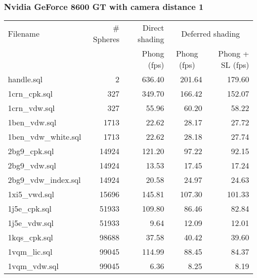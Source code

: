 \subsubsection*{Nvidia GeForce 8600 GT with camera distance 1}
\begin{tabular}{|l|r|r|r|r|}
\hline
Filename & \# Spheres & Direct shading & \multicolumn{2}{|c|}{Deferred shading} \\
         &            & Phong (fps)    & \multicolumn{1}{|c}{Phong (fps)} & Phong + SL (fps) \\  
\hline
\hline
handle.sql & 2 & 636.40 & 201.64 & 179.60 \\
\hline
1crn\_cpk.sql & 327 & 349.70 & 166.42 & 152.07 \\
\hline
1crn\_vdw.sql & 327 & 55.96 & 60.20 & 58.22 \\
\hline
1ben\_vdw.sql & 1713 & 22.62 & 28.17 & 27.72 \\
\hline
1ben\_vdw\_white.sql & 1713 & 22.62 & 28.18 & 27.74 \\
\hline
2bg9\_cpk.sql & 14924 & 121.20 & 97.22 & 92.15 \\
\hline
2bg9\_vdw.sql & 14924 & 13.53 & 17.45 & 17.24 \\
\hline
2bg9\_vdw\_index.sql & 14924 & 20.58 & 24.97 & 24.63 \\
\hline
1xi5\_vwd.sql & 15696 & 145.81 & 107.30 & 101.33 \\
\hline
1j5e\_cpk.sql & 51933 & 109.80 & 86.46 & 82.84 \\
\hline
1j5e\_vdw.sql & 51933 & 9.64 & 12.09 & 12.01 \\
\hline
1kqs\_cpk.sql & 98688 & 37.58 & 40.42 & 39.60 \\
\hline
1vqm\_lic.sql & 99045 & 114.99 & 88.45 & 84.37 \\
\hline
1vqm\_vdw.sql & 99045 & 6.36 & 8.25 & 8.19 \\
\hline
\end{tabular}
